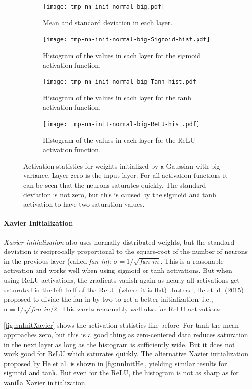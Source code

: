 			\begin{figure}
				\centering
				\begin{subfigure}{\linewidth}
					\texttt{[image: tmp-nn-init-normal-big.pdf]}
					\caption{Mean and standard deviation in each layer.}
				\end{subfigure}
				\begin{subfigure}{\linewidth}
					\texttt{[image: tmp-nn-init-normal-big-Sigmoid-hist.pdf]}
					\caption{Histogram of the values in each layer for the sigmoid activation function.}
				\end{subfigure}
				\begin{subfigure}{\linewidth}
					\texttt{[image: tmp-nn-init-normal-big-Tanh-hist.pdf]}
					\caption{Histogram of the values in each layer for the tanh activation function.}
				\end{subfigure}
				\begin{subfigure}{\linewidth}
					\texttt{[image: tmp-nn-init-normal-big-ReLU-hist.pdf]}
					\caption{Histogram of the values in each layer for the ReLU activation function.}
				\end{subfigure}
				\caption{Activation statistics for weights initialized by a Gaussian with big variance. Layer zero is the input layer. For all activation functions it can be seen that the neurons saturates quickly. The standard deviation is not zero, but this is caused by the sigmoid and tanh activation to have two saturation values.}
				\label{fig:nnInitBigRandom}
			\end{figure}

		\paragraph{Xavier Initialization}
			\emph{Xavier initialization} also uses normally distributed weights, but the standard deviation is reciprocally proportional to the square-root of the number of neurons in the previous layer (called \emph{fan in}): \( \sigma = 1/\sqrt{\textit{fan-in}} \). This is a reasonable activation and works well when using sigmoid or tanh activations. But when using ReLU activations, the gradients vanish again as nearly all activations get saturated in the left half of the ReLU (where it is flat). Instead, He et al. (2015) proposed to divide the fan in by two to get a better initialization, i.e., \( \sigma = 1/\sqrt{\textit{fan-in} / 2} \). This works reasonably well also for ReLU activations.

			\autoref{fig:nnInitXavier} shows the activation statistics like before. For tanh the mean approaches zero, but this is a good thing as zero-centered data reduces saturation in the next layer as long as the histogram is sufficiently wide. But it does not work good for ReLU which saturates quickly. The alternative Xavier initialization proposed by He et al. is shown in \autoref{fig:nnInitHe}, yielding similar results for sigmoid and tanh. But even for the ReLU, the histogram is not as sharp as for vanilla Xavier initialization.

